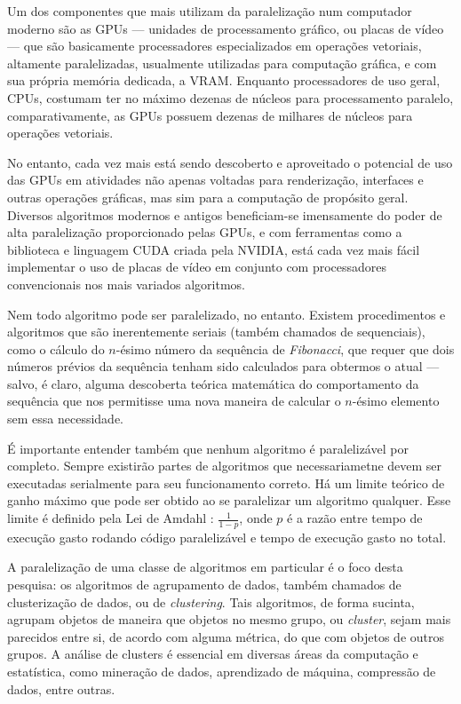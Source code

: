 \documentclass[12pt,
openright, 
oneside, %
a4paper,    %
brazil]{facom-ufu-abntex2}
\begin{document}
Um dos componentes que mais utilizam da paralelização num computador moderno são as GPUs --- unidades de processamento gráfico, ou placas de vídeo --- que são basicamente processadores especializados em operações vetoriais, altamente paralelizadas, usualmente utilizadas para computação gráfica, e com sua própria memória dedicada, a VRAM. Enquanto processadores de uso geral, CPUs, costumam ter no máximo dezenas de núcleos para processamento paralelo, comparativamente, as GPUs possuem dezenas de milhares  de núcleos para operações vetoriais.

No entanto, cada vez mais está sendo descoberto e aproveitado o potencial de uso das GPUs em atividades não apenas voltadas para renderização, interfaces e outras operações gráficas, mas sim para a computação de propósito geral. Diversos algoritmos modernos e antigos beneficiam-se imensamente do poder de alta paralelização proporcionado pelas GPUs, e com ferramentas como a biblioteca e linguagem CUDA criada pela NVIDIA, está cada vez mais fácil implementar o uso de placas de vídeo em conjunto com processadores convencionais nos mais variados algoritmos.

Nem todo algoritmo pode ser paralelizado, no entanto. Existem procedimentos e algoritmos que são inerentemente seriais (também chamados de sequenciais), como o cálculo do $n$-ésimo número da sequência de \textit{Fibonacci}, que requer que dois números prévios da sequência tenham sido calculados para obtermos o atual --- salvo, é claro, alguma descoberta teórica matemática do comportamento da sequência que nos permitisse uma nova maneira de calcular o $n$-ésimo elemento sem essa necessidade.

É importante entender também que nenhum algoritmo é paralelizável por completo. Sempre existirão partes de algoritmos que necessariametne devem ser executadas serialmente para seu funcionamento correto. Há um limite teórico de ganho máximo que pode ser obtido ao se paralelizar um algoritmo qualquer. Esse limite é definido pela Lei de Amdahl \cite{Amdahl-Law}: $\frac{1}{1-p}$, onde $p$ é a razão entre tempo de execução gasto rodando código paralelizável e tempo de execução gasto no total.

A paralelização de uma classe de algoritmos em particular é o foco desta pesquisa: os algoritmos de agrupamento de dados, também chamados de clusterização de dados, ou de \textit{clustering}. Tais algoritmos, de forma sucinta, agrupam objetos de maneira que objetos no mesmo grupo, ou \textit{cluster}, sejam mais parecidos entre si, de acordo com alguma métrica, do que com objetos de outros grupos. A análise de clusters é essencial em diversas áreas da computação e estatística, como mineração de dados, aprendizado de máquina, compressão de dados, entre outras.
\end{document}
